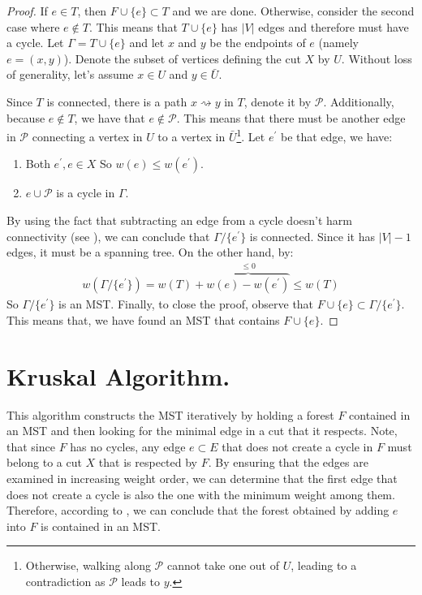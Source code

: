 \begin{proof}
If $e \in T$, then $F \cup \{ e \} \subset T$ and we are done. Otherwise, consider the second case where $e \notin T$. This means that $T \cup \{ e \}$ has $|V|$ edges and therefore must have a cycle. Let $\Gamma = T \cup \{ e \}$ and let $x$ and $y$ be the endpoints of $e$ (namely $e = (x,y)$). Denote the subset of vertices defining the cut $X$ by $U$. Without loss of generality, let's assume $x \in U$ and $y \in \bar{U}$.


Since $T$ is connected, there is a path $x \rightsquigarrow y$ in $T$, denote it by $\mathcal{P}$. Additionally, because $e \notin T$, we have that $e \notin \mathcal{P}$. This means that there must be another edge in $\mathcal{P}$ connecting a vertex in $U$ to a vertex in $\bar{U}$\footnote{Otherwise, walking along $\mathcal{P}$ cannot take one out of $U$, leading to a contradiction as $\mathcal{P}$ leads to $y$.}. Let $e^{\prime}$ be that edge, we have:\begin{enumerate}
    \item Both $e^{\prime}, e \in X$ So $w(e) \le w(e^{\prime})$.
    \item $e \cup \mathcal{P}$ is a cycle in $\Gamma$. 
  \end{enumerate}

By using the fact that subtracting an edge from a cycle doesn't harm connectivity (see ), we can conclude that $\Gamma/\{e^{\prime}\}$ is connected. Since it has $|V|-1$ edges, it must be a spanning tree. On the other hand, by:
  \begin{equation*}
    \begin{split}
      w\left( \Gamma/\{e^{\prime}\} \right) = w\left( T \right) + \overbrace{w(e) - w(e^{\prime})}^{ \le 0} \le w\left( T \right) 
    \end{split}
  \end{equation*}
  So $\Gamma/\{e^{\prime}\}$ is an MST.  Finally, to close the proof, observe that $F \cup \{e\} \subset \Gamma/\{e^{\prime}\}$. This means that, we have found an MST that contains $F \cup \{e\}$. 

\end{proof}
\section{Kruskal Algorithm.} This algorithm constructs the MST iteratively by holding a forest $F$ contained in an MST and then looking for the minimal edge in a cut that it respects. Note, that since $F$ has no cycles, any edge $e \subset E$ that does not create a cycle in $F$ must belong to a cut $X$ that is respected by $F$. By ensuring that the edges are examined in increasing weight order, we can determine that the first edge that does not create a cycle is also the one with the minimum weight among them. Therefore, according to , we can conclude that the forest obtained by adding $e$ into $F$ is contained in an MST.

